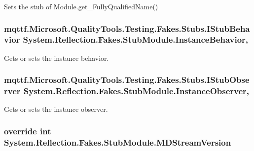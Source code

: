 Sets the stub of Module.\-get\-\_\-\-Fully\-Qualified\-Name()

\hypertarget{class_system_1_1_reflection_1_1_fakes_1_1_stub_module_a99800f33c4aa50c26d473d96f26e3731}{
\subsubsection[{Instance\-Behavior}]{\setlength{\rightskip}{0pt plus 5cm}mqttf.\-Microsoft.\-Quality\-Tools.\-Testing.\-Fakes.\-Stubs.\-I\-Stub\-Behavior System.\-Reflection.\-Fakes.\-Stub\-Module.\-Instance\-Behavior\hspace{0.3cm}{\ttfamily [get]}, {\ttfamily [set]}}}\label{class_system_1_1_reflection_1_1_fakes_1_1_stub_module_a99800f33c4aa50c26d473d96f26e3731}


Gets or sets the instance behavior.

\hypertarget{class_system_1_1_reflection_1_1_fakes_1_1_stub_module_a150c4f458ed6718637a8130554e6dcdb}{
\subsubsection[{Instance\-Observer}]{\setlength{\rightskip}{0pt plus 5cm}mqttf.\-Microsoft.\-Quality\-Tools.\-Testing.\-Fakes.\-Stubs.\-I\-Stub\-Observer System.\-Reflection.\-Fakes.\-Stub\-Module.\-Instance\-Observer\hspace{0.3cm}{\ttfamily [get]}, {\ttfamily [set]}}}\label{class_system_1_1_reflection_1_1_fakes_1_1_stub_module_a150c4f458ed6718637a8130554e6dcdb}


Gets or sets the instance observer.

\hypertarget{class_system_1_1_reflection_1_1_fakes_1_1_stub_module_a4605d0e60f4a766e69b22aaf2a8e6cd1}{
\subsubsection[{M\-D\-Stream\-Version}]{\setlength{\rightskip}{0pt plus 5cm}override int System.\-Reflection.\-Fakes.\-Stub\-Module.\-M\-D\-Stream\-Version\hspace{0.3cm}{\ttfamily [get]}}}\label{class_system_1_1_reflection_1_1_fakes_1_1_stub_module_a4605d0e60f4a766e69b22aaf2a8e6cd1}


